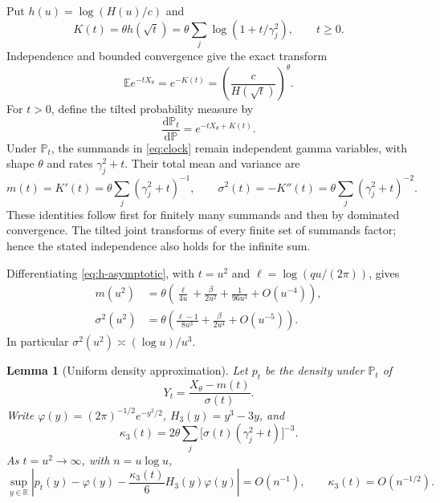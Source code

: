 \documentclass[11pt]{article}
\newtheorem{lemma}[theorem]{Lemma}
\theoremstyle{remark}\newtheorem{remark}[theorem]{Remark}
\newcommand{\E}{\mathbb E}
\newcommand{\Prob}{\mathbb P}
\newcommand{\R}{\mathbb R}
\newcommand{\dd}{\mathrm d}
\begin{document}
Put $h(u)=\log(H(u)/c)$ and
\begin{equation}\label{eq:K}
 K(t)=\theta h(\sqrt t)
     =\theta\sum_j\log(1+t/\gamma_j^2),\qquad t\geq0.
\end{equation}
Independence and bounded convergence give the exact transform
\begin{equation}\label{eq:laplace}
 \E e^{-tX_\theta}=e^{-K(t)}
     =\left(\frac c{H(\sqrt t)}\right)^\theta.
\end{equation}
For $t>0$, define the tilted probability measure by
\[
 \frac{\dd\Prob_t}{\dd\Prob}=e^{-tX_\theta+K(t)}.
\]
Under $\Prob_t$, the summands in \eqref{eq:clock} remain independent gamma
variables, with shape $\theta$ and rates $\gamma_j^2+t$. Their total mean
and variance are
\begin{equation}\label{eq:mean-var}
 m(t)=K'(t)=\theta\sum_j(\gamma_j^2+t)^{-1},\qquad
 \sigma^2(t)=-K''(t)=\theta\sum_j(\gamma_j^2+t)^{-2}.
\end{equation}
These identities follow first for finitely many summands and then by
dominated convergence. The tilted joint transforms of every finite set of
summands factor; hence the stated independence also holds for the infinite
sum.

Differentiating \eqref{eq:h-asymptotic}, with $t=u^2$ and
$\ell=\log(qu/(2\pi))$, gives
\begin{align}
 m(u^2)&=\theta\left(\frac{\ell}{4u}
                  +\frac{\beta}{2u^2}
                  +\frac1{96u^3}+O(u^{-4})\right),\label{eq:mexp}\\
 \sigma^2(u^2)&=\theta\left(\frac{\ell-1}{8u^3}
                  +\frac{\beta}{2u^4}+O(u^{-5})\right).
                  \label{eq:sexp}
\end{align}
In particular $\sigma^2(u^2)\asymp(\log u)/u^3$.

\begin{lemma}[Uniform density approximation]\label{lem:edgeworth}
Let $p_t$ be the density under $\Prob_t$ of
\[
 Y_t=\frac{X_\theta-m(t)}{\sigma(t)}.
\]
Write $\varphi(y)=(2\pi)^{-1/2}e^{-y^2/2}$,
$H_3(y)=y^3-3y$, and
\[
 \kappa_3(t)=
  2\theta\sum_j\bigl[\sigma(t)(\gamma_j^2+t)\bigr]^{-3}.
\]
As $t=u^2\to\infty$, with $n=u\log u$,
\begin{equation}\label{eq:edgeworth}
 \sup_{y\in\R}\left|
  p_t(y)-\varphi(y)-\frac{\kappa_3(t)}6H_3(y)\varphi(y)
 \right|=O(n^{-1}),\qquad \kappa_3(t)=O(n^{-1/2}).
\end{equation}
\end{lemma}
\end{document}
